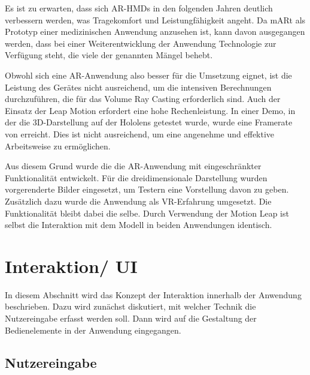 Es ist zu erwarten, dass sich AR-HMDs in den folgenden Jahren deutlich verbessern werden, was Tragekomfort und Leistungfähigkeit angeht. Da mARt als Prototyp einer medizinischen Anwendung anzusehen ist, kann davon ausgegangen werden, dass bei einer Weiterentwicklung der Anwendung Technologie zur Verfügung steht, die viele der genannten Mängel behebt.

Obwohl sich eine AR-Anwendung also besser für die Umsetzung eignet, ist die Leistung des Gerätes nicht ausreichend, um die intensiven Berechnungen durchzuführen, die für das Volume Ray Casting erforderlich sind. Auch der Einsatz der Leap Motion erfordert eine hohe Rechenleistung.
In einer Demo, in der die 3D-Darstellung auf der Hololens getestet wurde, wurde eine Framerate von 
 erreicht. 
Dies ist nicht ausreichend, um eine angenehme und effektive Arbeitsweise zu ermöglichen. 

Aus diesem Grund wurde die die AR-Anwendung mit eingeschränkter Funktionalität entwickelt. Für die dreidimensionale Darstellung wurden vorgerenderte Bilder eingesetzt, um Testern eine Vorstellung davon zu geben.
Zusätzlich dazu wurde die Anwendung als VR-Erfahrung umgesetzt. Die Funktionalität bleibt dabei die selbe. 
Durch Verwendung der Motion Leap ist selbst die Interaktion mit dem Modell in beiden Anwendungen identisch. 

\section{Interaktion/ UI } 

In diesem Abschnitt wird das Konzept der Interaktion innerhalb der Anwendung beschrieben. Dazu wird zunächst diskutiert, mit welcher Technik die Nutzereingabe erfasst werden soll. Dann wird auf die Gestaltung der Bedienelemente in der Anwendung eingegangen.

\subsection{Nutzereingabe}

